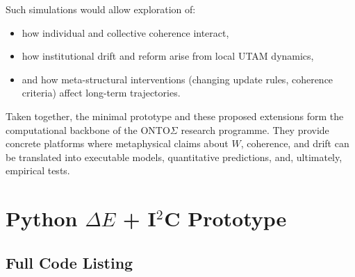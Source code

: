 \documentclass[12pt,a4paper]{report}
\newcommand{\Will}{W}
\begin{document}
Such simulations would allow exploration of:

\begin{itemize}[leftmargin=2em]
    \item how individual and collective coherence interact,
    \item how institutional drift and reform arise from local UTAM dynamics,
    \item and how meta-structural interventions (changing update rules, coherence criteria) affect long-term trajectories.
\end{itemize}

Taken together, the minimal prototype and these proposed extensions form the computational backbone of the ONTO$\Sigma$ research programme. They provide concrete platforms where metaphysical claims about \(\Will\), coherence, and drift can be translated into executable models, quantitative predictions, and, ultimately, empirical tests.

\appendix

\chapter{Python $\Delta E$ + I$^2$C Prototype}
\label{appendix:python-prototype}

\section*{Full Code Listing}
\end{document}
